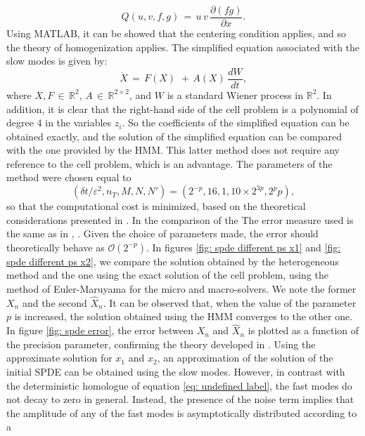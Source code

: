 \begin{equation*}
    Q(u,v,f,g) \,=\, u \, v \, \frac{{\partial}(fg)}{{\partial}x}. 
\end{equation*}
Using MATLAB, it can be showed that the centering condition applies, and so the theory of homogenization applies. 
The simplified equation associated with the slow modes is given by:
\begin{equation}
    \dot X \,=\, F(X) \, \,+\, A(X) \, \frac{dW}{dt},
\end{equation}
where $X,F\,{\in}\,\mathbb R^2$, $A \,{\in}\,\mathbb R^{2{\times}2}$, and $W$ is a standard Wiener process in $\mathbb R^2$.
In addition, it is clear that the right-hand side of the cell problem is a polynomial of degree 4 in the variables $z_i$.
So the coefficients of the simplified equation can be obtained exactly, and the solution of the simplified equation can be compared with the one provided by the HMM.
This latter method does not require any reference to the cell problem, which is an advantage. 
The parameters of the method were chosen equal to $$ ({\delta}t/{\varepsilon}^2, n_T, M,N, N') = ( 2^{-p}, 16, 1 , 10{\times}2^{3p}, 2^pp),$$ so that the computational cost is minimized, based on the theoretical considerations presented in \cite{weinan2005analysis}. 
In the comparison of the The error measure used is the same as in
\cite{weinan2005analysis}, . Given the choice of
parameters made, the error should theoretically behave as $\mathcal O(2^{- p
})$.  In figures \ref{fig: spde different ps x1} and \ref{fig: spde different
    ps x2}, we compare the solution obtained by the heterogeneous method and
the one using the exact solution of the cell problem, using the method of Euler-Maruyama for the micro and macro-solvers. 
We note the former $X_n$ and the second $\hat X_n$. 
It can be observed that, when the value of the parameter $p$ is increased, the solution obtained using the HMM converges to the other one.
In figure \ref{fig: spde error}, the error between $X_n$ and $\hat X_n$ is plotted as a function of the precision parameter, confirming the theory developed in \citep{abdulle2012numerical,weinan2005analysis}.
Using the approximate solution for $x_1$ and $x_2$, an approximation of the solution of the initial SPDE can be obtained using the slow modes.
However, in contrast with the deterministic homologue of equation \eqref{eq: undefined label}, the fast modes do not  decay to zero in general.
Instead, the presence of the noise term implies that the amplitude of any of the fast modes is asymptotically distributed according to a
